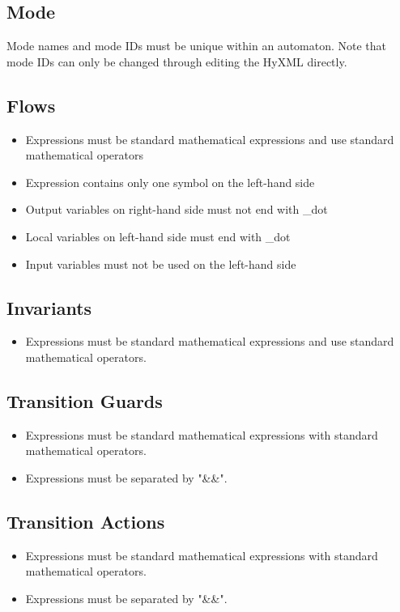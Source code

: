 \documentclass{tufte-book} %
\begin{document}
    \subsection{Mode}
        Mode names and mode IDs must be unique within an automaton. Note that mode IDs can only be changed through editing the HyXML directly. 
        \subsection{Flows}
            \begin{itemize}
                \item Expressions must be standard mathematical expressions and use standard mathematical operators
                \item Expression contains only one symbol on the left-hand side
                \item Output variables on right-hand side must not end with \_dot
                \item Local variables on left-hand side must end with \_dot
                \item Input variables must not be used on the left-hand side
            \end{itemize}
        \subsection{Invariants}
            \begin{itemize}
                \item Expressions must be standard mathematical expressions and use standard mathematical operators. 
            \end{itemize}
    \subsection{Transition Guards}
            \begin{itemize}
                \item Expressions must be standard mathematical expressions with standard mathematical operators. 
                \item Expressions must be separated by "\&\&". 
            \end{itemize}
        \subsection{Transition Actions}
            \begin{itemize}
                \item Expressions must be standard mathematical expressions with standard mathematical operators.
                \item Expressions must be separated by "\&\&".
            \end{itemize}
\end{document}
